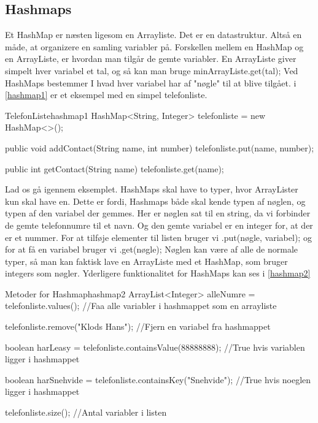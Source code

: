 
\subsection{Hashmaps}


Et HashMap er næsten ligesom en Arrayliste. Det er en datastruktur.
Altså en måde, at organizere en samling variabler på. Forskellen
mellem en HashMap og en ArrayListe, er hvordan man tilgår de gemte
variabler. En ArrayListe giver simpelt hver variabel et tal, og så kan
man bruge minArrayListe.get(tal); Ved HashMaps bestemmer I hvad hver
variabel har af "nøgle" til at blive tilgået. i \autoref{hashmap1} er
et eksempel med en simpel telefonliste.

\begin{JavaCode}{TelefonListe}{hashmap1}
	HashMap<String, Integer> telefonliste = new HashMap<>();

	public void addContact(String name, int number){
		telefonliste.put(name, number);
	}

	public int getContact(String name){
		telefonliste.get(name);
	}
\end{JavaCode}

Lad os gå igennem eksemplet. HashMaps skal have to typer, hvor
ArrayLister kun skal have en. Dette er fordi, Hashmaps både skal
kende typen af nøglen, og typen af den variabel der gemmes. Her er
nøglen sat til en string, da vi forbinder de gemte telefonnumre til et
navn. Og den gemte variabel er en integer for, at  der er et nummer.
For at tilføje elementer til listen bruger vi .put(nøgle, variabel);
og for at få en variabel bruger vi .get(nøgle); Nøglen kan være af
alle de normale typer, så man kan faktisk lave en ArrayListe med et
HashMap, som bruger integers som nøgler. Yderligere funktionalitet for
HashMaps kan ses i \autoref{hashmap2}

\begin{JavaCode}{Metoder for Hashmap}{hashmap2}
	ArrayList<Integer> alleNumre = telefonliste.values();
	//Faa alle variabler i hashmappet som en arrayliste

	telefonliste.remove("Klods Hans");
	//Fjern en variabel fra hashmappet

	boolean harLeasy = telefonliste.containsValue(88888888);
	//True hvis variablen ligger i hashmappet

	boolean harSnehvide = telefonliste.containsKey("Snehvide");
	//True hvis noeglen ligger i hashmappet

	telefonliste.size();
	//Antal variabler i listen
\end{JavaCode}

